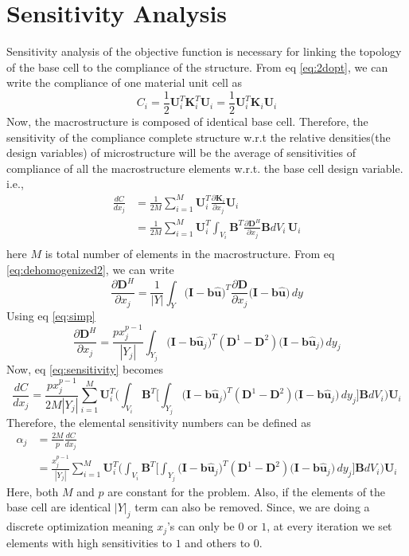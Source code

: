 \documentclass[openright,twoside]{iitkthesis}
\newcommand{\e}[1]{\textbf{#1}}
\newcommand{\fj}[2]{\frac{\partial #1}{\partial #2}}
\begin{document}
\section{Sensitivity Analysis}
Sensitivity analysis of the objective function is necessary for linking the topology of the base cell to the compliance of the structure. From eq \eqref{eq:2dopt}, we can write the compliance of one material unit cell as 
\begin{equation}
C_i = \frac{1}{2}\e U_i^T\e K_i^T\e U_i = \frac{1}{2}\e U_i^T\e K_i\e U_i
\end{equation}
Now, the macrostructure is composed of identical base cell. Therefore, the sensitivity of the compliance complete structure w.r.t the relative densities(the design variables) of microstructure will be the average of sensitivities of compliance of all the macrostructure elements w.r.t. the base cell design variable. i.e.,
\begin{equation}
\label{eq:sensitivity}
\begin{split}
\frac{dC}{dx_j} &= \frac{1}{2M}\sum_{i=1}^M\e U_i^T\fj{\e K_i}{x_j}\e U_i\\
&= \frac{1}{2M}\sum_{i=1}^M\e U_i^T\int_{V_i} \textbf{B}^T\fj{\e D^H}{x_j}\textbf{B} dV_i\,\e U_i\\
\end{split}
\end{equation}
here $M$ is total number of elements in the macrostructure. From eq \eqref{eq:dehomogenized2}, we can write
\begin{equation}
\fj{\e D^H}{x_j} = \frac{1}{|Y|}\int_Y\big (\e I-\textbf{b}\hat{\e u}\big)^T\fj{\e D}{x_j}\big (\e I-\textbf{b}\hat{\e u}\big)\,dy
\end{equation}
Using eq \eqref{eq:simp}
\begin{equation}
\fj{\e D^H}{x_j} = \frac{px^{p-1}_j}{|Y_j|}\int_{Y_j}\big (\e I-\e b\hat{\e u}_j\big)^T(\e D^1 - \e D^2)\big (\e I-\textbf{b}\hat{\e u}_j\big)\,dy_j
\end{equation}
Now, eq \eqref{eq:sensitivity} becomes
\begin{equation}
\label{eq:sensitivity1}
\frac{dC}{dx_j} = \frac{px^{p-1}_j}{2M|Y_j|}\sum_{i=1}^M\e U_i^T\bigg (\int_{V_i} \textbf{B}^T\bigg[\int_{Y_j}\big (\e I-\e b\hat{\e u}_j\big)^T(\e D^1 - \e D^2)\big (\e I-\textbf{b}\hat{\e u}_j\big)\,dy_j\bigg]\textbf{B} dV_i\bigg )\e U_i
\end{equation}
Therefore, the elemental sensitivity numbers can be defined as
\begin{equation}
\label{eq:senanal}
\begin{split}
\alpha_j &= \frac{2M}{p}\frac{dC}{dx_j}\\
&=\frac{x^{p-1}_j}{|Y_j|}\sum_{i=1}^M\e U_i^T\bigg (\int_{V_i} \textbf{B}^T\bigg[\int_{Y_j}\big (\e I-\e b\hat{\e u}_j\big)^T(\e D^1 - \e D^2)\big (\e I-\textbf{b}\hat{\e u}_j\big)\,dy_j\bigg]\textbf{B} dV_i\bigg )\e U_i
\end{split}
\end{equation}
Here, both $M$ and $p$ are constant for the problem. Also, if the elements of the base cell are identical $|Y|_j$ term can also be removed. Since, we are doing a discrete optimization meaning $x_j$'s can only be $0$ or $1$, at every iteration we set elements with high sensitivities to $1$ and others to $0$.
\end{document}
